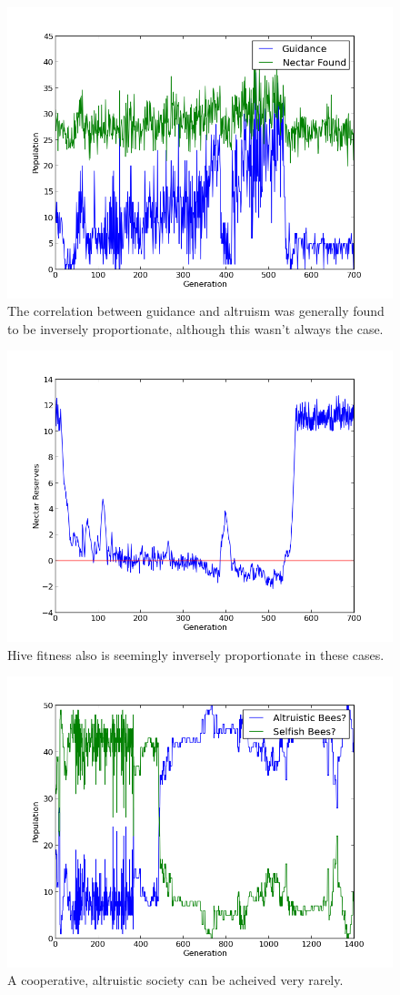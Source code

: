 \documentclass[twoside]{article}
\begin{document}
\begin{multicols}{2}
			\begin{figure}[H]
				\begin{center}
					\includegraphics[width=.5\textwidth]{results/gossip_plot_twist_tell.png}
				\end{center}
                \caption{The correlation between guidance and altruism was generally found to be inversely proportionate, although this wasn't always the case.}
				\label{fig:gossip_guidance}
			\end{figure}

                        \begin{figure}[H]
				\begin{center}
					\includegraphics[width=.5\textwidth]{results/gossip_plot_twist_res.png}
				\end{center}
				\caption{Hive fitness also is seemingly inversely proportionate in these cases.}
				\label{fig:gossip_reserves}
			\end{figure}

			\begin{figure}[H]
				\begin{center}
					\includegraphics[width=.5\textwidth]{results/gossip_alt_comp.png}
				\end{center}
				\caption{A cooperative, altruistic society can be acheived very rarely.}
				\label{fig:altruistic_composition}
			\end{figure}


\end{multicols}
\end{document}
